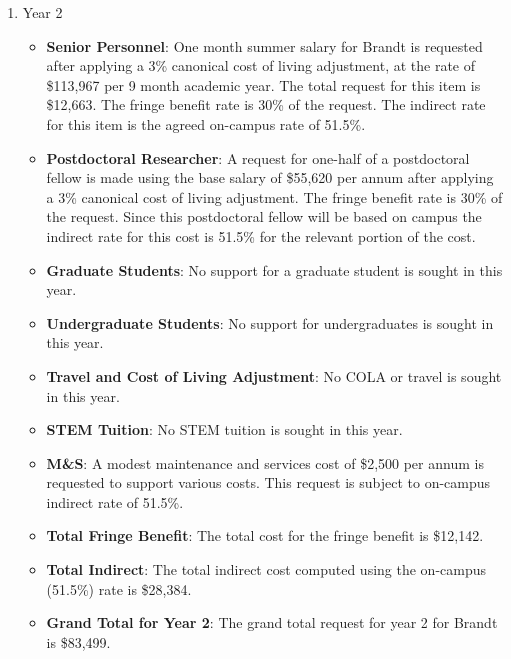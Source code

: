 \begin{enumerate}
\item{Year 2}
\begin{itemize}[noitemsep,nolistsep]
\item{{\bf Senior Personnel}: One month summer salary for Brandt is requested after applying a 3\% canonical cost of living adjustment, at the rate of \$113,967 per 9 month academic year.  The total request for this item is \$12,663.   The fringe benefit rate is 30\% of the request.  The indirect rate for this item is the agreed on-campus rate of 51.5\%.}

\item {{\bf Postdoctoral Researcher}: A request for one-half of a postdoctoral fellow is made using the base salary of \$55,620 per annum after applying a 3\% canonical cost of living adjustment.  The fringe benefit rate is 30\% of the request.  Since this postdoctoral fellow will be based on campus the indirect rate for this cost is 51.5\% for the relevant portion of the cost.} 

\item{{\bf Graduate Students}: No support for a graduate student is sought in this year. }

\item {{\bf Undergraduate Students}: No support for undergraduates is sought in this year.}

\item{{\bf Travel and Cost of Living Adjustment}: No COLA or travel is sought in this year.}

\item {{\bf STEM Tuition}: No STEM tuition is sought in this year.}

\item {{\bf M\&S}: A modest maintenance and services cost of \$2,500 per annum is requested to support various costs.   This request is subject to on-campus indirect rate of 51.5\%.}

\item {{\bf Total Fringe Benefit}: The total cost for the fringe benefit is \$12,142.}

\item {{\bf Total Indirect}: The total indirect cost computed using the on-campus (51.5\%) rate is \$28,384.}

\item {{\bf Grand Total for Year 2}: The grand total request for year 2 for Brandt is \$83,499.}

\end{itemize}


\end{enumerate}
